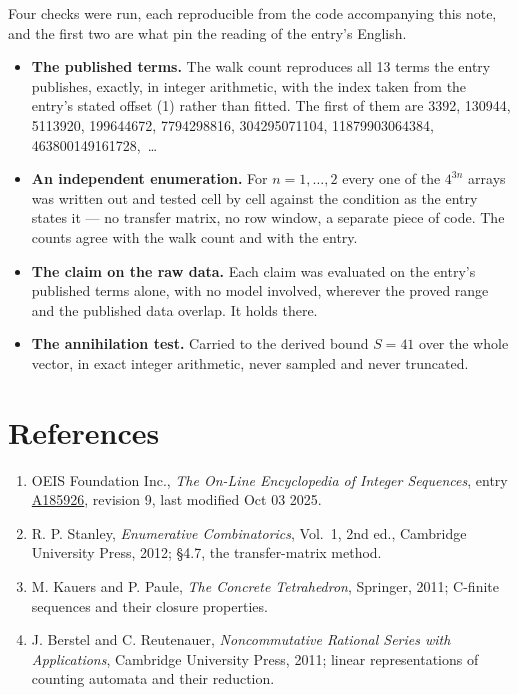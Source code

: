 \documentclass[11pt]{article}
\theoremstyle{definition}
\begin{document}
Four checks were run, each reproducible from the code accompanying this note, and the first two are what pin the reading of the entry's English.

\begin{itemize}

\item {\bfseries The published terms.} The walk count reproduces all 13 terms the entry publishes, exactly, in integer arithmetic, with the index taken from the entry's stated offset (1) rather than fitted. The first of them are 3392, 130944, 5113920, 199644672, 7794298816, 304295071104, 11879903064384, 463800149161728,~\dots

\item {\bfseries An independent enumeration.} For $n = 1,\dots,2$ every one of the $4^{3n}$ arrays was written out and tested cell by cell against the condition as the entry states it --- no transfer matrix, no row window, a separate piece of code. The counts agree with the walk count and with the entry.

\item {\bfseries The claim on the raw data.} Each claim was evaluated on the entry's published terms alone, with no model involved, wherever the proved range and the published data overlap. It holds there.

\item {\bfseries The annihilation test.} Carried to the derived bound $S = 41$ over the whole vector, in exact integer arithmetic, never sampled and never truncated.

\end{itemize}

\section{References}

\begin{enumerate}

\item OEIS Foundation Inc., \emph{The On-Line Encyclopedia of Integer Sequences}, entry \href{https://oeis.org/A185926}{A185926}, revision 9, last modified Oct 03 2025.

\item R. P. Stanley, \emph{Enumerative Combinatorics}, Vol.~1, 2nd ed., Cambridge University Press, 2012; \S4.7, the transfer-matrix method.

\item M. Kauers and P. Paule, \emph{The Concrete Tetrahedron}, Springer, 2011; C-finite sequences and their closure properties.

\item J. Berstel and C. Reutenauer, \emph{Noncommutative Rational Series with Applications}, Cambridge University Press, 2011; linear representations of counting automata and their reduction.

\end{enumerate}
\end{document}
